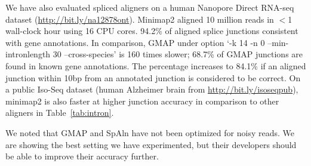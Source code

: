 \documentclass{bioinfo}
\begin{document}
We have also evaluated spliced aligners on a human Nanopore Direct RNA-seq
dataset (\href{http://bit.ly/na12878ont}{http://bit.ly/na12878ont}). Minimap2
aligned 10 million reads in $<$1 wall-clock hour using 16 CPU cores. 94.2\% of
aligned splice junctions consistent with gene annotations. In comparison,
GMAP under option `-k 14 -n 0 --min-intronlength 30 --cross-species' is 160
times slower; 68.7\% of GMAP junctions are found in known gene annotations. The
percentage increases to 84.1\% if an aligned junction within 10bp from an
annotated junction is considered to be correct. On a public Iso-Seq dataset
(human Alzheimer brain from
\href{http://bit.ly/isoseqpub}{http://bit.ly/isoseqpub}), minimap2 is also
faster at higher junction accuracy in comparison to other aligners in
Table~\ref{tab:intron}.

We noted that GMAP and SpAln have not been optimized for noisy reads. We are
showing the best setting we have experimented, but their developers should be
able to improve their accuracy further.

\end{document}
